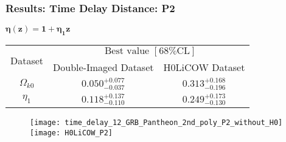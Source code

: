 \documentclass[10pt,xcolor={dvipsnames}]{beamer}
\begin{document}
\begin{frame}
 \frametitle{Results: Time Delay Distance: P2}
 $
{\boxed{\boldsymbol{\eta(z)=1+\eta_1z}}}
$
\begin{table}
  \begin{tabular}{|c|c|c|}
    \hline
    \multirow{2}{*}{Dataset} &
      \multicolumn{2}{c|}{${\text { Best value }[68 \% \mathrm{CL}]}$} \\
\cline{2-3}
    &Double-Imaged Dataset & H0LiCOW Dataset \\
    \hline
    $\Omega_{k0}$ & $ {0.050_{-0.037}^{+0.077}}$ &  $0.313^{+0.168}_{-0.196}$ \\
    \hline
    $ \eta_1$ &$ {0.118_{-0.110}^{+0.137}}$ & $0.249^{+0.173}_{-0.130}$  \\
       \hline
  \end{tabular}
\end{table}
%
 \begin{figure}[ht!]
\centering
\texttt{[image: time\_delay\_12\_GRB\_Pantheon\_2nd\_poly\_P2\_without\_H0]}
\texttt{[image: H0LiCOW\_P2]}
\end{figure} 
\end{frame}
\end{document}
